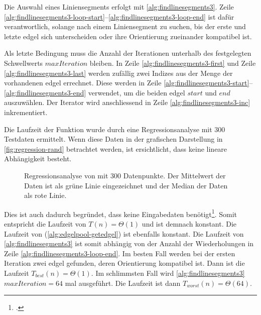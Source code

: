 Die Auswahl eines Liniensegments erfolgt mit \autoref{alg:findlinesegments3}. Zeile
 \ref{alg:findlinesegments3-loop-start}--\ref{alg:findlinesegments3-loop-end} ist dafür verantwortlich, solange nach
 einem Liniensegment zu suchen, bis der erste und letzte \gls{edgel} sich unterscheiden oder ihre Orientierung
 zueinander kompatibel ist.

Als letzte Bedingung muss die Anzahl der Iterationen unterhalb des festgelegten Schwellwerts $\mathit{maxIteration}$
 bleiben. In Zeile \ref{alg:findlinesegments3-first} und Zeile \ref{alg:findlinesegments3-last} werden zufällig zwei
 Indizes aus der Menge der vorhandenen \gls{edgel} errechnet. Diese werden in Zeile
 \ref{alg:findlinesegments3-start}--\ref{alg:findlinesegments3-end} verwendet, um die beiden \gls{edgel}
 $\mathit{start}$ und $\mathit{end}$ auszuwählen. Der Iterator wird anschliessend in Zeile
 \ref{alg:findlinesegments3-inc} inkrementiert.

Die Laufzeit der Funktion  wurde durch eine Regressionsanalyse mit $300$ Testdaten ermittelt. Wenn diese
 Daten in der grafischen Darstellung in \autoref{fig:regression-rand} betrachtet werden, ist ersichtlicht, dass keine
 lineare Abhängigkeit besteht.
\begin{figure}[!ht]
	\centering
	
	\caption{Regressionsanalyse von  mit $300$ Datenpunkte. Der Mittelwert der Daten ist als grüne Linie
	 eingezeichnet und der Median der Daten als rote Linie.}
	\label{fig:regression-rand}
\end{figure}
Dies ist auch dadurch begründet, dass  keine Eingabedaten benötigt\footcite[Vgl.][]{rand}. Somit
 entspricht die Laufzeit von  $T(n) = \Theta(1)$ und ist demnach konstant. Die Laufzeit von
  (\autoref{alg:edgelpool-getedgel}) ist ebenfalls konstant. Die Laufzeit von
 \autoref{alg:findlinesegments3} ist somit abhängig von der Anzahl der Wiederholungen in Zeile
 \ref{alg:findlinesegments3-loop-end}. Im besten Fall werden bei der ersten Iteration zwei \gls{edgel} gefunden, deren
 Orientierung kompatibel ist. Dann ist die Laufzeit $T_{best}(n) = \Theta(1)$. Im schlimmsten Fall wird
 \autoref{alg:findlinesegments3} $\mathit{maxIteration} = 64$ mal ausgeführt. Die Laufzeit ist dann
 $T_{worst} (n) = \Theta(64)$.


